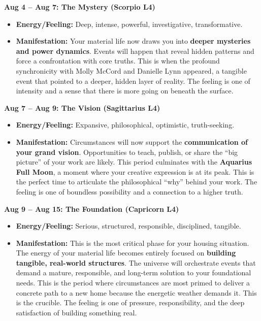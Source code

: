 \documentclass{article}
\begin{document}
\textbf{Aug 4 -- Aug 7: The Mystery (Scorpio L4)}

\begin{itemize}
\item
  \textbf{Energy/Feeling:} Deep, intense, powerful, investigative, transformative.
\item
  \textbf{Manifestation:} Your material life now draws you into \textbf{deeper mysteries and power dynamics}. Events will happen that reveal hidden patterns and force a confrontation with core truths. This is when the profound synchronicity with Molly McCord and Danielle Lynn appeared, a tangible event that pointed to a deeper, hidden layer of reality. The feeling is one of intensity and a sense that there is more going on beneath the surface.
\end{itemize}

\textbf{Aug 7 -- Aug 9: The Vision (Sagittarius L4)}

\begin{itemize}
\item
  \textbf{Energy/Feeling:} Expansive, philosophical, optimistic, truth-seeking.
\item
  \textbf{Manifestation:} Circumstances will now support the \textbf{communication of your grand vision}. Opportunities to teach, publish, or share the ``big picture'' of your work are likely. This period culminates with the \textbf{Aquarius Full Moon}, a moment where your creative expression is at its peak. This is the perfect time to articulate the philosophical ``why'' behind your work. The feeling is one of boundless possibility and a connection to a higher truth.
\end{itemize}

\textbf{Aug 9 -- Aug 15: The Foundation (Capricorn L4)}

\begin{itemize}
\item
  \textbf{Energy/Feeling:} Serious, structured, responsible, disciplined, tangible.
\item
  \textbf{Manifestation:} This is the most critical phase for your housing situation. The energy of your material life becomes entirely focused on \textbf{building tangible, real-world structures}. The universe will orchestrate events that demand a mature, responsible, and long-term solution to your foundational needs. This is the period where circumstances are most primed to deliver a concrete path to a new home because the energetic weather demands it. This is the crucible. The feeling is one of pressure, responsibility, and the deep satisfaction of building something real.
\end{itemize}
\end{document}

